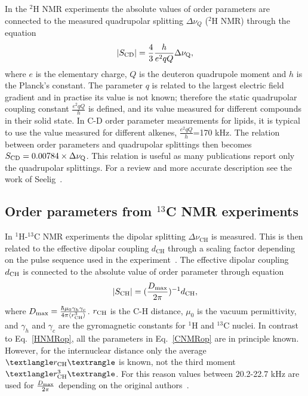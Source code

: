 \documentclass[aps,prl,superscriptaddress,twocolumn]{revtex4}
\begin{document}
In the $^2$H NMR experiments the absolute values of order parameters are connected to the measured quadrupolar 
splitting $\Delta \nu_Q$ ($^2$H NMR) through the equation 
\begin{equation}\label{HNMRop}
|S_{{\rm CD}}|=\frac{4}{3} \frac{h}{e^2qQ} \Delta \nu_{{\rm Q}}, 
\end{equation}
where $e$ is the elementary charge, $Q$ is the deuteron quadrupole moment and $h$ is the Planck's constant. 
The parameter $q$ is related to the largest electric field gradient and in practise its value is not known; 
therefore the static quadrupolar coupling constant $\frac{e^2qQ}{h}$ is defined, and its value measured for 
different compounds in their solid state. In C-D order parameter measurements for lipids, it is typical to 
use the value  measured for different alkenes, $\frac{e^2qQ}{h}$=170 kHz. The relation between order parameters 
and quadrupolar splittings then becomes $S_{{\rm CD}}=0.00784 \times \Delta \nu_{{\rm Q}}$.
This relation is useful as many publications report only the quadrupolar splittings. For a review and more accurate description see the work of Seelig~\cite{seelig77c}.

\subsection{Order parameters from $^{13}$C NMR experiments}

In $^1$H-$^{13}$C NMR experiments the dipolar splitting $\Delta \nu_\mathrm{CH}$  is measured. This is then related to
the effective dipolar coupling $d_\mathrm{CH}$ through a scaling factor depending on the pulse sequence used in the 
experiment~\cite{hong95a,gross97,dvinskikh05a,ferreira13}. The effective dipolar coupling $d_{{\rm CH}}$ is 
connected to the absolute value of order parameter through equation
\begin{equation}\label{CNMRop}
|S_{{\rm CH}}|=(\frac{D_{{\rm max}}}{2\pi})^{-1}d_\mathrm{CH},
\end{equation}
where $D_{{\rm max}} = \frac{\hbar \mu_0 \gamma_h \gamma_c}{4\pi\langle r_\mathrm{CH}^3 \rangle}$. 
$r_{{\rm CH}}$ is the C-H distance, $\mu_0$ is the vacuum permittivity, and $\gamma_h$ and $\gamma_c$ are 
the gyromagnetic constants for $^1$H and $^{13}$C nuclei. In contrast to Eq.~\ref{HNMRop}, all the parameters in 
Eq.~\ref{CNMRop} are in principle known. However, for the internuclear distance only the average $⟨r_{{\rm CH}}⟩$ 
is known, not the third moment $⟨r^3_{{\rm CH}}⟩$. For this reason values between 20.2-22.7 kHz are used for
$\frac{D_{{\rm max}}}{2\pi}$ depending on the original authors~\cite{hong95a,gross97,dvinskikh05a,becker06,ferreira13,ferreira15}.
\end{document}
